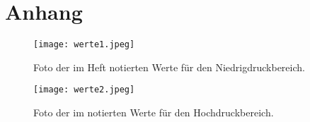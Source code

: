 \section{Anhang}
\begin{figure}
    \centering
    \texttt{[image: werte1.jpeg]}
    \caption{Foto der im Heft notierten Werte für den Niedrigdruckbereich.}
\end{figure}

\begin{figure}
    \centering
    \texttt{[image: werte2.jpeg]}
    \caption{Foto der im notierten Werte für den Hochdruckbereich.}
\end{figure}